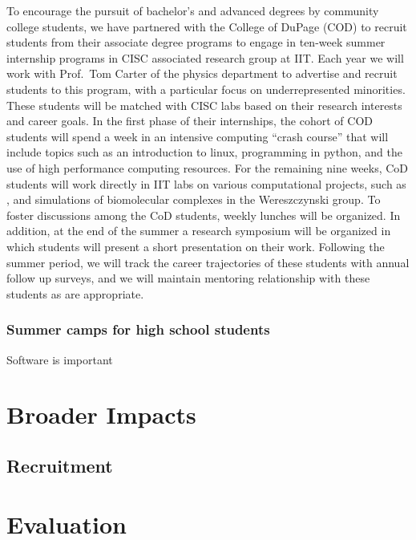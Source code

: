 \documentclass[11pt]{NSFamsart}
\begin{document}
To  encourage the pursuit of bachelor's and advanced degrees by community college students, we have partnered with the College of DuPage (COD) to recruit students from their associate degree programs  to engage in ten-week summer internship programs in CISC associated research group at IIT. Each year we will work with Prof.~Tom Carter of the physics department to advertise and recruit students to this program,  with a particular focus on underrepresented minorities.  These students will be matched with CISC labs based on their research interests and career goals.  In the first phase of their internships, the cohort of COD students will spend a week in an intensive computing ``crash course'' that will include topics such as an introduction to linux, programming in python, and the use of high performance computing resources.  For the remaining nine weeks, CoD students will work directly in IIT labs on various computational projects, such as , and simulations of biomolecular complexes in the Wereszczynski group.  To foster discussions among the CoD students, weekly lunches will be organized.  In addition, at the end of the summer a research symposium will be organized in which students will present a short presentation on their work.  Following the summer period, we will track the career trajectories of these students with annual follow up surveys, and we will maintain mentoring relationship with these students as are appropriate. 



\subsubsection*{Summer camps for high school students}


Software is important \cite{RudEtal18a}

\section{Broader Impacts}

\subsection{Recruitment}
\section{Evaluation}


\newpage
\clearpage
\setcounter{page}{1}



{\renewcommand\addcontentsline[3]{} 
\renewcommand{\refname}{{\Large\textbf{References Cited}}}                   %
\renewcommand{\bibliofont}{\normalsize}

}
\end{document}

